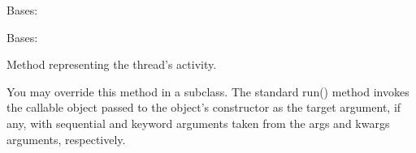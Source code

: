 \documentclass[letterpaper,10pt,english]{sphinxmanual}
\begin{document}

\begin{fulllineitems}
\label{\detokenize{classes:classes.pyRunWithRetry.RunCommandWithRetryExeception}}
\pysigstartsignatures
{}
\pysigstopsignatures
\sphinxAtStartPar
Bases: 

\end{fulllineitems}


\begin{fulllineitems}
\label{\detokenize{classes:classes.pyRunWithRetry.command}}
\pysigstartsignatures
{}
\pysigstopsignatures
\sphinxAtStartPar
Bases: 

\begin{fulllineitems}
\label{\detokenize{classes:classes.pyRunWithRetry.command.run}}
\pysigstartsignatures
{}
\pysigstopsignatures
\sphinxAtStartPar
Method representing the thread’s activity.

\sphinxAtStartPar
You may override this method in a subclass. The standard run() method
invokes the callable object passed to the object’s constructor as the
target argument, if any, with sequential and keyword arguments taken
from the args and kwargs arguments, respectively.

\end{fulllineitems}


\begin{fulllineitems}
\label{\detokenize{classes:classes.pyRunWithRetry.command.wait}}
\pysigstartsignatures
{}
\pysigstopsignatures
\end{fulllineitems}


\end{fulllineitems}
\end{document}
